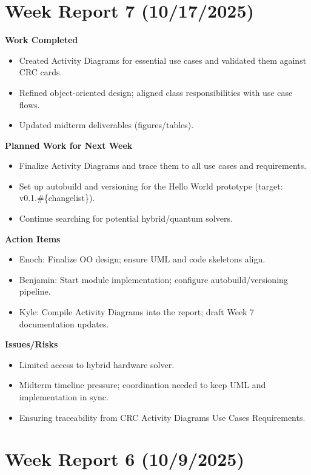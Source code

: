 \section{Week Report 7 (10/17/2025)}
\label{sec::W7}

\textbf{Work Completed}
\begin{itemize}
  \item Created Activity Diagrams for essential use cases and validated them against CRC cards.
  \item Refined object-oriented design; aligned class responsibilities with use case flows.
  \item Updated midterm deliverables (figures/tables).
\end{itemize}

\textbf{Planned Work for Next Week}
\begin{itemize}
  \item Finalize Activity Diagrams and trace them to all use cases and requirements.
  \item Set up autobuild and versioning for the Hello World prototype (target: v0.1.\#\{changelist\}).
  \item Continue searching for potential hybrid/quantum solvers.
\end{itemize}

\textbf{Action Items}
\begin{itemize}
  \item Enoch: Finalize OO design; ensure UML and code skeletons align.
  \item Benjamin: Start module implementation; configure autobuild/versioning pipeline.
  \item Kyle: Compile Activity Diagrams into the report; draft Week 7 documentation updates.
\end{itemize}

\textbf{Issues/Risks}
\begin{itemize}
  \item Limited access to hybrid hardware solver.
  \item Midterm timeline pressure; coordination needed to keep UML and implementation in sync.
  \item Ensuring traceability from CRC \textrightarrow{} Activity Diagrams \textrightarrow{} Use Cases \textrightarrow{} Requirements.
\end{itemize}

\section{Week Report 6 (10/9/2025)}
\label{sec::W6}

